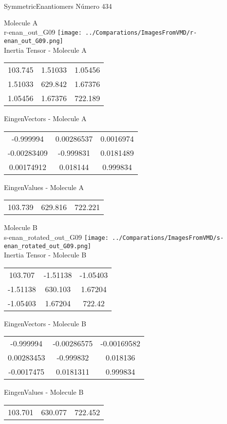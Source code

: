 \vtab[-2cm]
\begin{center}
{\large SymmetricEnantiomers \tab Número 434}
\end{center}
\begin{multicols}{2}
\begin{center}

Molecule A \\ 
r-enan\_out\_G09
\texttt{[image: ../Comparations/ImagesFromVMD/r-enan\_out\_G09.png]}
\\
Inertia Tensor - Molecule A \\
\vtab

\begin{tabular}{|c c c|}
103.745	 & 	1.51033	 & 	1.05456	 \\
1.51033	 & 	629.842	 & 	1.67376	 \\
1.05456	 & 	1.67376	 & 	722.189
\end{tabular}

\vtab
 EingenVectors - Molecule A     \\
\vtab
\begin{tabular}{|c c c|}
-0.999994	 & 	0.00286537	 & 	0.0016974	 \\
-0.00283409	 & 	-0.999831	 & 	0.0181489	 \\
0.00174912	 & 	0.018144	 & 	0.999834
\end{tabular}

\vtab
 EingenValues - Molecule A     \\
\vtab
\begin{tabular}{|c c c|}
103.739	 & 	629.816	 & 	722.221	 \\
\end{tabular}
\columnbreak

Molecule B \\ 
s-enan\_rotated\_out\_G09
\texttt{[image: ../Comparations/ImagesFromVMD/s-enan\_rotated\_out\_G09.png]}
\\
Inertia Tensor - Molecule B \\
\vtab

\begin{tabular}{|c c c|}
103.707	 & 	-1.51138	 & 	-1.05403	 \\
-1.51138	 & 	630.103	 & 	1.67204	 \\
-1.05403	 & 	1.67204	 & 	722.42
\end{tabular}

\vtab
 EingenVectors - Molecule B     \\
\vtab
\begin{tabular}{|c c c|}
-0.999994	 & 	-0.00286575	 & 	-0.00169582	 \\
0.00283453	 & 	-0.999832	 & 	0.018136	 \\
-0.0017475	 & 	0.0181311	 & 	0.999834
\end{tabular}

\vtab
 EingenValues - Molecule B     \\
\vtab
\begin{tabular}{|c c c|}
103.701	 & 	630.077	 & 	722.452	 \\
\end{tabular}

\end{center}
\end{multicols}
